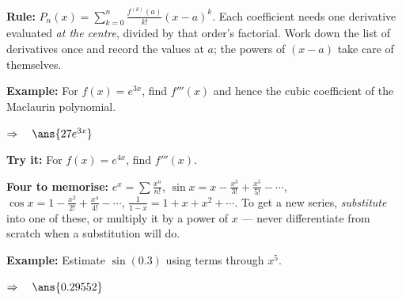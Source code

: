 \documentclass[12pt]{article}
\begin{document}


\begin{formulabox}
\textbf{Rule:} $P_{n}(x) = \displaystyle\sum_{k=0}^{n}\frac{f^{(k)}(a)}{k!}(x-a)^{k}$. Each coefficient needs one derivative evaluated \emph{at the centre}, divided by that order's factorial. Work down the list of derivatives once and record the values at $a$; the powers of $(x-a)$ take care of themselves.
\end{formulabox}

\begin{examplebox}
\textbf{Example:} \quad For $f(x) = e^{3x}$, find $f'''(x)$ and hence the cubic coefficient of the Maclaurin polynomial.

$\Rightarrow\quad \ans{27e^{3x}}$
\end{examplebox}

\begin{tryitbox}
\textbf{Try it:} \quad For $f(x) = e^{4x}$, find $f'''(x)$.\\[2pt]
\end{tryitbox}


\begin{formulabox}
\textbf{Four to memorise:} $e^{x} = \sum \frac{x^{n}}{n!}$, \; $\sin x = x - \frac{x^{3}}{3!} + \frac{x^{5}}{5!} - \cdots$, \; $\cos x = 1 - \frac{x^{2}}{2!} + \frac{x^{4}}{4!} - \cdots$, \; $\frac{1}{1-x} = 1 + x + x^{2} + \cdots$. To get a new series, \emph{substitute} into one of these, or multiply it by a power of $x$ --- never differentiate from scratch when a substitution will do.
\end{formulabox}

\begin{examplebox}
\textbf{Example:} \quad Estimate $\sin(0.3)$ using terms through $x^{5}$.

$\Rightarrow\quad \ans{0.29552}$
\end{examplebox}
\end{document}
